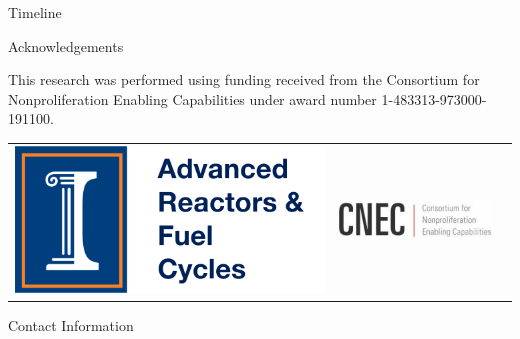 \documentclass[final]{beamer}
\newlength{\onecolwid}
\newlength{\threecolwid}
\begin{document}
\begin{frame}[t]
\begin{columns}[t,totalwidth=\threecolwid]
\begin{column}{\onecolwid}
\begin{block}{Timeline}
        
\end{block}





\begin{block}{Acknowledgements}
	
	This research was performed using funding received
	from the Consortium for Nonproliferation Enabling
	Capabilities under award number 1-483313-973000-191100.
	
	\vspace{10mm}
	\begin{center}
		\begin{tabular}{ccc}
			\includegraphics[width=0.3\linewidth]{logo.png} & \includegraphics[width=0.3\linewidth]{cnec_oldlogo.png}
		\end{tabular}
	\end{center}
	
	
\end{block}





\begin{alertblock}{Contact Information}
	\begin{itemize}
		

\end{itemize}
\end{alertblock}
\end{column}
\end{columns}
\end{frame}
\end{document}
